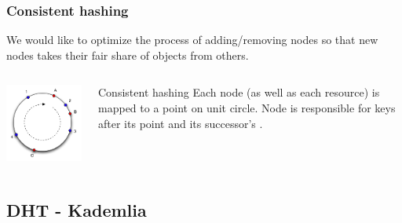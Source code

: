 \documentclass{beamer}
\begin{document}
\begin{frame}
\frametitle{Consistent hashing}

\begin{block}{}
We would like to optimize the process of adding/removing nodes so that new nodes
takes their fair share of objects from others.
\end{block}

\begin{columns}[c]

\begin{center}
\includegraphics[width=0.75\linewidth]{consistent_hashing_1.png}
\end{center}

\begin{block}{Consistent hashing}
Each node (as well as each resource) is mapped to a point on unit circle.
Node is responsible for keys after its point and its successor's \cite{karger1999web}. 
\end{block}

\end{columns}

\end{frame}



\subsection{DHT - Kademlia}
\end{document}

